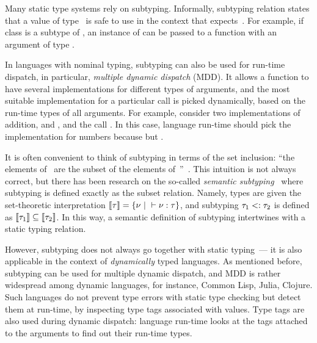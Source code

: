 Many static type systems rely on subtyping.
Informally, subtyping relation  states that
a value of type~ is safe to use 
in the context that expects~.
For example, if class  is a subtype of ,
an instance of  can be passed to a function
with an argument of type .

In languages with nominal typing, subtyping can also be used for run-time
dispatch, in particular, \emph{multiple dynamic dispatch} (MDD).
It allows a function to have several implementations 
for different types of arguments,
and the most suitable implementation for a particular call 
is picked dynamically, based on the run-time types of all arguments.
For example, consider two implementations of addition,
 and ,
and the call .
In this case, language run-time should pick 
the implementation for numbers 
because  but .

It is often convenient to think of subtyping 
in terms of the set inclusion: ``the elements of~ are the subset
of the elements of~''~\cite{TAPL}.
This intuition is not always correct, but there has been research on
the so-called \emph{semantic subtyping}~\cite{?} where subtyping is defined
exactly as the subset relation. %
Namely, types are given the set-theoretic interpretation
$\llbracket \tau \rrbracket = \{\nu ~\vert~ \vdash \nu : \tau \}$, 
and subtyping $\tau_1 <: \tau_2$ is defined 
as $\llbracket \tau_1 \rrbracket \subseteq \llbracket \tau_2 \rrbracket$.
In this way, a semantic definition of subtyping intertwines with 
a static typing relation.

However, subtyping does not always go together with static typing~---
it is also applicable in the context of \emph{dynamically} typed languages.
As mentioned before, subtyping can be used for multiple dynamic dispatch,
and MDD is rather widespread among dynamic languages, for instance,
Common Lisp, Julia, Clojure.
Such languages do not prevent type errors with static type checking
but detect them at run-time, by inspecting type tags associated with values.
Type tags are also used during dynamic dispatch: 
language run-time looks at the tags attached to the arguments
to find out their run-time types.

